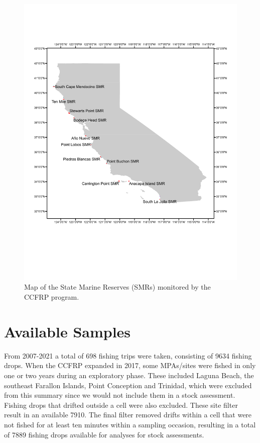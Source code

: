 \documentclass[
]{article}
\begin{document}
\begin{figure}
\centering
\includegraphics{MPA_map.pdf}
\caption{\label{fig:fig-mpa-map}Map of the State Marine Reserves (SMRs) monitored by the CCFRP program.}
\end{figure}

\hypertarget{available-samples}{%
\section{Available Samples}\label{available-samples}}

From 2007-2021 a total of 698 fishing trips
were taken, consisting of 9634 fishing drops. When the CCFRP
expanded in 2017, some MPAs/sites were fished in only one or two years during an
exploratory phase. These included Laguna Beach, the southeast Farallon Islands,
Point Conception and Trinidad, which were excluded from this summary since we
would not include them in a stock assessment.
Fishing drops that drifted outside a cell were also excluded. These site filter
result in an available 7910. The final filter removed
drifts within a cell that were not fished for at least ten minutes within a sampling
occasion, resulting in a total of 7889 fishing
drops available for analyses for stock assessments.
\end{document}
